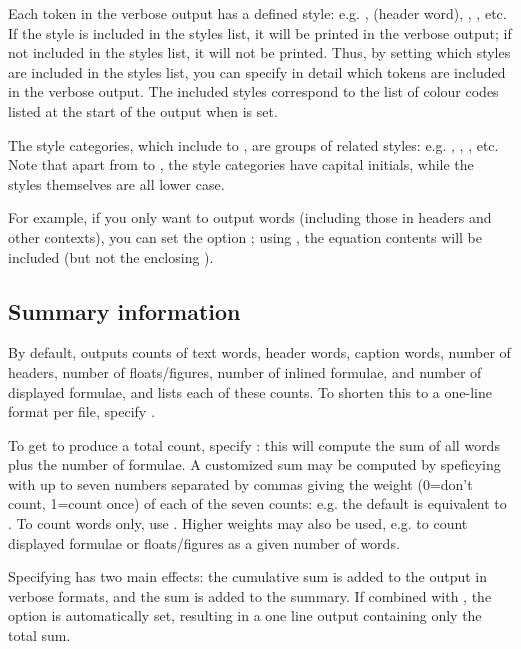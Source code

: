 \documentclass{article}
\begin{document}
Each token in the verbose output has a defined style: e.g. ,  (header word), , , etc. If the style is included in the styles list, it will be printed in the verbose output; if not included in the styles list, it will not be printed. Thus, by setting which styles are included in the styles list, you can specify in detail which tokens are included in the verbose output. The included styles correspond to the list of colour codes listed at the start of the output when  is set.

The style categories, which include  to , are groups of related styles: e.g. , , , etc. Note that apart from  to , the style categories have capital initials, while the styles themselves are all lower case.

For example, if you only want to output words (including those in headers and other contexts), you can set the option ; using , the equation contents will be included (but not the enclosing \code{\$\ldots\$}).


\subsection{Summary information}

By default, \TeXcount{} outputs counts of text words, header words, caption words, number of headers, number of floats/figures, number of inlined formulae, and number of displayed formulae, and lists each of these counts. To shorten this to a one-line format per file, specify .

To get \TeXcount{} to produce a total count, specify : this will compute the sum of all words plus the number of formulae. A customized sum may be computed by speficying  with up to seven numbers separated by commas giving the weight (0=don't count, 1=count once) of each of the seven counts: e.g. the default is equivalent to . To count words only, use . Higher weights may also be used, e.g. to count displayed formulae or floats/figures as a given number of words.

Specifying  has two main effects: the cumulative sum is added to the output in verbose formats, and the sum is added to the summary. If combined with , the option  is automatically set, resulting in a one line output containing only the total sum.
\end{document}
